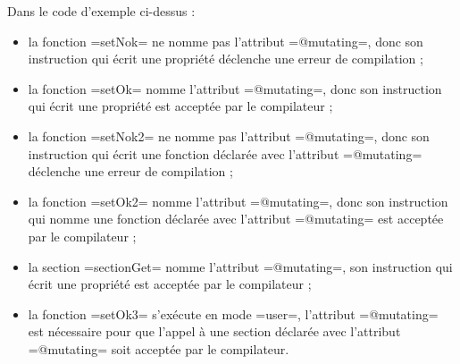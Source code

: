 
Dans le code d'exemple ci-dessus :
\begin{itemize}
  \item la fonction \plm=setNok= ne nomme pas l'attribut \plm=@mutating=, donc son instruction qui écrit une propriété déclenche une erreur de compilation ;
  \item la fonction \plm=setOk= nomme l'attribut \plm=@mutating=, donc son instruction qui écrit une propriété est acceptée par le compilateur ;
  \item la fonction \plm=setNok2= ne nomme pas l'attribut \plm=@mutating=, donc son instruction qui écrit une fonction déclarée avec l'attribut \plm=@mutating= déclenche une erreur de compilation ;
  \item la fonction \plm=setOk2= nomme l'attribut \plm=@mutating=, donc son instruction qui nomme une fonction déclarée avec l'attribut \plm=@mutating= est acceptée par le compilateur ;
  \item la section \plm=sectionGet= nomme l'attribut \plm=@mutating=, son instruction qui écrit une propriété est acceptée par le compilateur ;
  \item la fonction \plm=setOk3= s'exécute en mode \plm=user=, l'attribut \plm=@mutating= est nécessaire pour que l'appel à une section déclarée avec l'attribut \plm=@mutating= soit acceptée par le compilateur.
\end{itemize}












